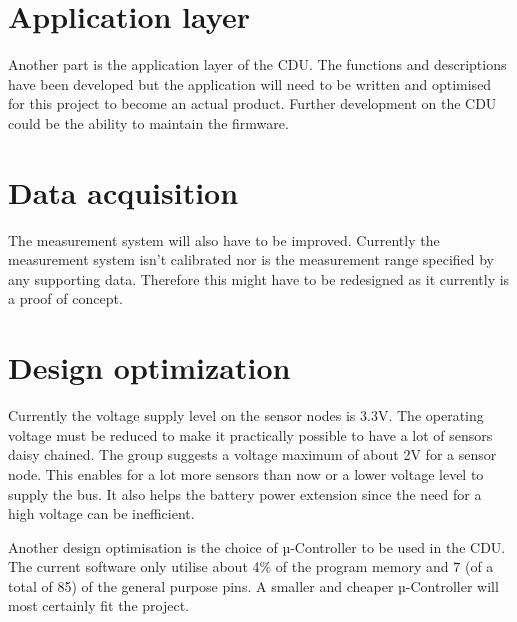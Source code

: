 \section{Application layer}
Another part is the application layer of the CDU. The functions and descriptions have been developed but the application will need to be written and optimised for this project to become an actual product. Further development on the CDU could be the ability to maintain the firmware.

\section{Data acquisition}
The measurement system will also have to be improved. Currently the measurement system isn't calibrated nor is the measurement range specified by any supporting data. Therefore this might have to be redesigned as it currently is a proof of concept.

\section{Design optimization}
\label{sec:DO}
Currently the voltage supply level on the sensor nodes is 3.3V. The operating voltage must be reduced to make it practically possible to have a lot of sensors daisy chained. The group suggests a voltage maximum of about 2V for a sensor node. This enables for a lot more sensors than now or a lower voltage level to supply the bus. It also helps the battery power extension since the need for a high voltage can be inefficient.

Another design optimisation is the choice of µ-Controller to be used in the CDU. The current software only utilise about 4\% of the program memory and 7 (of a total of 85) of the general purpose pins. A smaller and cheaper µ-Controller will most certainly fit the project.